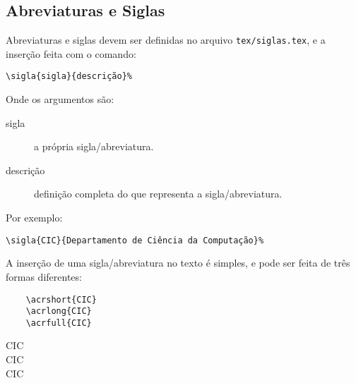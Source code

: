\subsection{Abreviaturas e Siglas}
Abreviaturas e siglas devem ser definidas no arquivo \texttt{tex/siglas.tex}, e
a inserção feita com o comando:

\begin{verbatim}
\sigla{sigla}{descrição}%
\end{verbatim}

Onde os argumentos são:
\begin{description}
	\item[sigla] a própria sigla/abreviatura.
	\item[descrição] definição completa do que representa a sigla/abreviatura.
\end{description}

Por exemplo:

\begin{verbatim}
\sigla{CIC}{Departamento de Ciência da Computação}%
\end{verbatim}

A inserção de uma sigla/abreviatura no texto é simples, e pode ser feita de três
formas diferentes:

\begin{minipage}[t]{.3\textwidth}%
	\begin{verbatim}
	\acrshort{CIC}
	\acrlong{CIC}
	\acrfull{CIC}
	\end{verbatim}
\end{minipage}%
\begin{minipage}[t]{.6\textwidth}%
	\acrshort{CIC}\\
	\acrlong{CIC}\\
	\acrfull{CIC}
\end{minipage}%